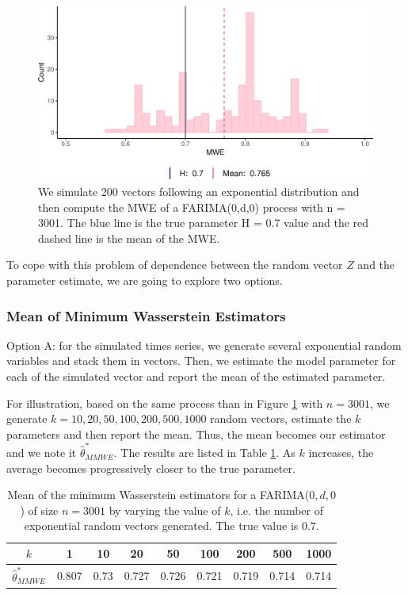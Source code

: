 \documentclass[
  11pt,
]{article}
\begin{document}
\begin{figure}[h]

{\centering \includegraphics[width=0.6\linewidth]{Master_thesis_V2_files/figure-latex/MWE_n-1} 

}

\caption{We simulate 200 vectors following an exponential distribution and then compute the MWE of a FARIMA(0,d,0) process with n = 3001. The blue line is the true parameter H = 0.7 value and the red dashed line is the mean of the MWE.}\label{fig:MWE_n}
\end{figure}

To cope with this problem of dependence between the random vector \(Z\)
and the parameter estimate, we are going to explore two options.

\hypertarget{mean-of-minimum-wasserstein-estimators}{%
\subsubsection{Mean of Minimum Wasserstein
Estimators}\label{mean-of-minimum-wasserstein-estimators}}

Option A: for the simulated times series, we generate several
exponential random variables and stack them in vectors. Then, we
estimate the model parameter for each of the simulated vector and report
the mean of the estimated parameter.

For illustration, based on the same process than in Figure
\ref{fig:MWE_n} with \(n = 3001\), we generate
\(k = 10, 20 , 50, 100 , 200, 500, 1000\) random vectors, estimate the
\(k\) parameters and then report the mean. Thus, the mean becomes our
estimator and we note it \(\hat \theta^*_{MMWE}\). The results are
listed in Table \ref{tab:MWE_k}. As \(k\) increases, the average becomes
progressively closer to the true parameter.

\begin{table}[h]
\centering
\begin{tabular}{|c|c|c|c|c|c|c|c|c|}
\hline
$k$ &  1 & 10   & 20    & 50    & 100   & 200   & 500   & 1000 \\
\hline
$\hat \theta^*_{MMWE}$ & 0.807 & 0.73 & 0.727 & 0.726 & 0.721 & 0.719 & 0.714 & 0.714 \\
\hline
\end{tabular}
\caption{Mean of the minimum Wasserstein estimators for a FARIMA($0,d,0$) of size $n = 3001$ by varying the value of $k$, i.e. the number of exponential random vectors generated. The true value is 0.7.}
\label{tab:MWE_k}
\end{table}
\end{document}
